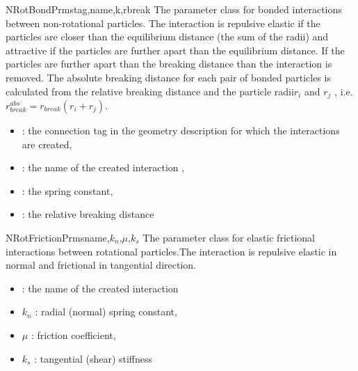 \documentclass{manual}
\begin{document}
\begin{classdesc}{NRotBondPrms}{tag,name,k,rbreak}
The parameter class for bonded interactions between non-rotational particles. The interaction is repulsive elastic if the particles are closer than the equilibrium distance (the sum of the radii) and attractive if the particles are further apart than the equilibrium distance. If the particles are further apart than the breaking distance than the interaction is removed. The absolute breaking distance for each pair of bonded particles is calculated from the relative breaking distance  and the particle radii$r_i$ and $r_j$ , i.e. $r^{abs}_{break}=r_{break}(r_i+r_j)$.
\begin{itemize}
\item {} : the connection tag in the geometry description for which the interactions are created,
\item {} : the name of the created interaction ,
\item {} :  the spring constant,
\item {} : the relative breaking distance
\end{itemize}

\end{classdesc}

\begin{classdesc}{NRotFrictionPrms}{name,$k_n$,$\mu$,$k_s$}
The parameter class for elastic frictional interactions between rotational particles.The interaction is repulsive elastic in normal and frictional in tangential direction.  
\begin{itemize}
\item {} : the name of the created interaction
\item $k_n$ : radial (normal) spring constant,
\item $\mu$ : friction coefficient,
\item $k_s$ : tangential (shear) stiffness
\end{itemize}
\end{classdesc}
\end{document}
